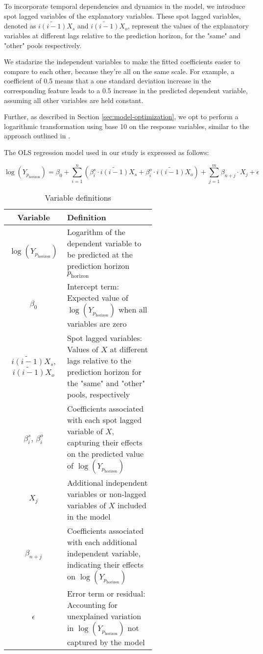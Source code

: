 \documentclass{article}
\begin{document}
To incorporate temporal dependencies and dynamics in the model, we introduce spot lagged variables of the explanatory variables. These spot lagged variables, denoted as \(\widetilde{i(i-1)}X_s\) and \(\widetilde{i(i-1)}X_o\), represent the values of the explanatory variables at different lags relative to the prediction horizon, for the "same" and "other" pools respectively.

We stadarize the independent variables to make the fitted coefficients easier to compare to each other, because they're all on the same scale. For example, a coefficient of 0.5 means that a one standard deviation increase in the corresponding feature leads to a 0.5 increase in the predicted dependent variable, assuming all other variables are held constant.

Further, as described in Section \ref{sec:model-optimization}, we opt to perform a logarithmic transformation using base 10 on the response variables, similar to the approach outlined in \cite{Miori2023}.

The OLS regression model used in our study is expressed as follows:

\begin{equation}
  \log(Y_{p_{\text{horizon}}}) = \beta_0 + \sum_{i=1}^{n} \left(\beta_i^s \cdot \widetilde{i(i-1)}X_s + \beta_i^o \cdot \widetilde{i(i-1)}X_o\right) + \sum_{j=1}^{m} \beta_{n+j} \cdot X_j + \epsilon
  \end{equation}
  
  \begin{table}[h!]
    \centering
    \begin{tabular}{|c|p{0.6\linewidth}|}
    \hline
    \textbf{Variable} & \textbf{Definition} \\
    \hline
    \(\log(Y_{p_{\text{horizon}}})\) & Logarithm of the dependent variable to be predicted at the prediction horizon \(p_{\text{horizon}}\) \\
    \(\beta_0\) & Intercept term: Expected value of \(\log(Y_{p_{\text{horizon}}})\) when all variables are zero \\
    \(\widetilde{i(i-1)}X_s\), \(\widetilde{i(i-1)}X_o\) & Spot lagged variables: Values of \(X\) at different lags relative to the prediction horizon for the "same" and "other" pools, respectively \\
    \(\beta_i^s\), \(\beta_i^o\) & Coefficients associated with each spot lagged variable of \(X\), capturing their effects on the predicted value of \(\log(Y_{p_{\text{horizon}}})\) \\
    \(X_j\) & Additional independent variables or non-lagged variables of \(X\) included in the model \\
    \(\beta_{n+j}\) & Coefficients associated with each additional independent variable, indicating their effects on \(\log(Y_{p_{\text{horizon}}})\) \\
    \(\epsilon\) & Error term or residual: Accounting for unexplained variation in \(\log(Y_{p_{\text{horizon}}})\) not captured by the model \\
    \hline
    \end{tabular}
    \caption{Variable definitions}
    \label{tab:variables}
  \end{table}
\end{document}
